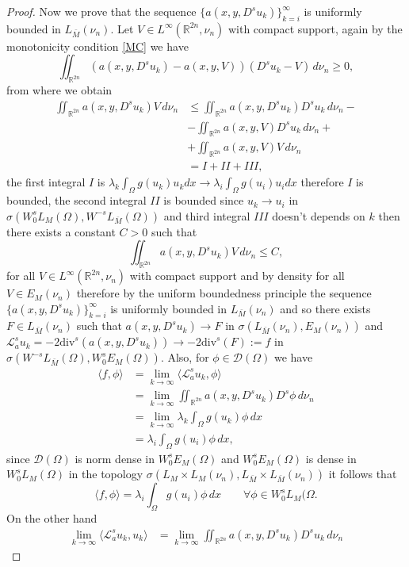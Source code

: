 \documentclass{amsart}
\newcommand{\A}{\mathcal{L}_a^s}
\newcommand{\R}{{\mathbb R}}
\theoremstyle{remark}
\theoremstyle{definition}
\numberwithin{equation}{section}
\begin{document}
\begin{proof}
Now we prove that the sequence $\{a(x,y,D^su_k)\}_{k=i}^\infty$ is uniformly bounded in $L_{\bar{M}}(\nu_n)$. Let $V\in L^{\infty}(\R^{2n},\nu_n)$ with compact support, again by the monotonicity condition \ref{MC} we have
$$	
\iint_{\R^{2n}}(a(x,y,D^s u_k)-a(x,y,V))(D^s u_k-V)\,d\nu_n\geq 0,
$$
from where we obtain
\begin{align*}
\iint_{\R^{2n}}a(x,y,D^s u_k) V\,d\nu_n &\leq \iint_{\R^{2n}}a(x,y,D^s u_k) D^s u_k\,d\nu_n -\\
& - \iint_{\R^{2n}}a(x,y,V) D^s u_k\,d\nu_n+	
\\
& +\iint_{\R^{2n}}a(x,y,V) V\,d\nu_n
\\
& = I+II+III,
\end{align*}
the first integral $I$ is $\lambda_k \int_\Omega g(u_k) u_k dx\to \lambda_i \int_\Omega g(u_i) u_i dx$ therefore $I$ is bounded, the second integral $II$ is bounded since $u_k\to u_i$ in $\sigma(W_0^s L_M(\Omega),W^{-s}L_{\bar{M}}(\Omega))$ and third integral $III$ doesn't depends on $k$ then there exists a constant $C>0$ such that 
$$
\iint_{\R^{2n}}a(x,y,D^s u_k) V\,d\nu_n\leq C,
$$
for all $V\in L^{\infty}(\R^{2n},\nu_n)$ with compact support and by density for all $V\in E_M(\nu_n)$ therefore by the uniform boundedness principle the sequence $\{a(x,y,D^su_k)\}_{k=i}^\infty$ is uniformly bounded in $L_{\bar{M}}(\nu_n)$ and so there exists $F\in L_{\bar{M}}(\nu_n)$ such that $a(x,y,D^su_k)\to F$ in $\sigma(L_{\bar{M}}(\nu_n),E_M (\nu_n))$ and  $ \A u_k=-2\mathrm{div}^s(a(x,y,D^su_k))\to -2 \mathrm{div}^s(F):=f$ in $\sigma(W^{-s}L_{\bar{M}}(\Omega), W_0^s E_M(\Omega))$. Also, for $\phi\in {\mathcal D}(\Omega)$ we have
\begin{align*}
\langle f,\phi\rangle&=\lim_{k\to\infty} \langle \A u_k,\phi \rangle
\\
&=\lim_{k\to\infty}\iint_{\R^{2n}}a(x,y,D^s u_k)D^s\phi\,d\nu_n\\
&=\lim_{k\to\infty} \lambda_k \int_\Omega  g(u_k)\phi\,dx
\\
&=\lambda_i	\int_\Omega  g(u_i)\phi\,dx,
\end{align*}
since ${\mathcal D}(\Omega)$ is norm dense in $W_0^s E_M(\Omega)$ and $W_0^s E_M(\Omega)$ is dense in $W_0^s L_M(\Omega)$ in the topology $\sigma(L_M\times L_M (\nu_n), L_{\bar{M}}\times L_{\bar{M}} (\nu_n))$ it follows that 
$$
\langle f,\phi\rangle=\lambda_i	\int_\Omega  g(u_i)\phi\,dx\qquad \forall \phi\in W_0^s L_M(\Omega.
$$
On the other hand
\begin{align*}
\lim_{k\to\infty} \langle \A u_k,u_k \rangle	&=\lim_{k\to\infty}\iint_{\R^{2n}}a(x,y,D^su_k)D^su_k\,d\nu_n

\end{align*}
\end{proof}
\end{document}
